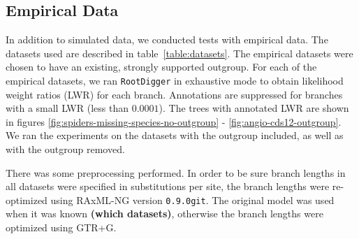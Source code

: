 \documentclass{article}
\newcommand{\RootDiggertt}{\texttt{RootDigger}}
\newcommand{\BenComment}[1]{{\bf \color{blue} ({#1})}}
\begin{document}
%
%
%

\subsection{Empirical Data}

In addition to simulated data, we conducted tests with empirical data. The
datasets used are described in table~\ref{table:datasets}.  The empirical
datasets were chosen to have an existing, strongly supported outgroup.  For each
of the empirical datasets, we ran \RootDiggertt{} in exhaustive mode to obtain
likelihood weight ratios (LWR) for each branch.  Annotations are suppressed for
branches with a small LWR (less than $0.0001$).  The trees with annotated LWR
are shown in figures \ref{fig:spiders-missing-species-no-outgroup} -
\ref{fig:angio-cds12-outgroup}.  We ran the experiments on the datasets with the
outgroup included, as well as with the outgroup removed.

There was some preprocessing performed. In order to be sure branch lengths in
all datasets were specified in substitutions per site, the branch lengths were
re-optimized using RAxML-NG \cite{kozlov_raxml-ng:_2019} version
\texttt{0.9.0git}. The original model was used when it was
known\BenComment{which datasets}, otherwise the
branch lengths were optimized using GTR+G.

\begin{table}[H]
  \begin{center}
    
    \label{table:datasets}
  \end{center}
\end{table}
\end{document}
